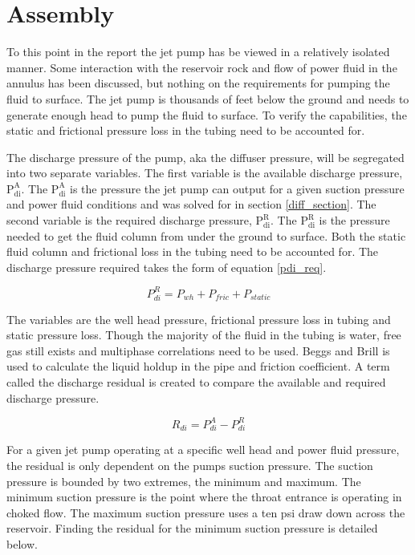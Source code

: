 \documentclass[12 pt]{report}
\newcommand{\pdiA}{$\mathrm{P_{di}^{A}}$\xspace}  %
\newcommand{\pdiR}{$\mathrm{P_{di}^{R}}$\xspace}  %
\begin{document}
\section{Assembly}
To this point in the report the jet pump has be viewed in a relatively isolated manner. Some interaction with the reservoir rock and flow of power fluid in the annulus has been discussed, but nothing on the requirements for pumping the fluid to surface. The jet pump is thousands of feet below the ground and needs to generate enough head to pump the fluid to surface. To verify the capabilities, the static and frictional pressure loss in the tubing need to be accounted for.

The discharge pressure of the pump, aka the diffuser pressure, will be segregated into two separate variables. The first variable is the available discharge pressure, \pdiA. The \pdiA is the pressure the jet pump can output for a given suction pressure and power fluid conditions and was solved for in section \ref{diff_section}. The second variable is the required discharge pressure, \pdiR. The \pdiR is the pressure needed to get the fluid column from under the ground to surface. Both the static fluid column and frictional loss in the tubing need to be accounted for. The discharge pressure required takes the form of equation \eqref{pdi_req}.

\begin{equation}
P_{di}^R = P_{wh} + P_{fric} + P_{static}
\label{pdi_req}
\end{equation}

The variables are the well head pressure, frictional pressure loss in tubing and static pressure loss. Though the majority of the fluid in the tubing is water, free gas still exists and multiphase correlations need to be used. Beggs and Brill \cite{payne_multiphase} is used to calculate the liquid holdup in the pipe and friction coefficient. A term called the discharge residual is created to compare the available and required discharge pressure. 

\begin{equation}
R_{di} = P_{di}^A - P_{di}^R
\label{res_disch}
\end{equation}

For a given jet pump operating at a specific well head and power fluid pressure, the residual is only dependent on the pumps suction pressure. The suction pressure is bounded by two extremes, the minimum and maximum. The minimum suction pressure is the point where the throat entrance is operating in choked flow. The maximum suction pressure uses a ten psi draw down across the reservoir. Finding the residual for the minimum suction pressure is detailed below.
\end{document}
